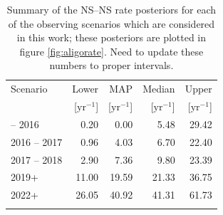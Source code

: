 \documentclass[twocolumn,nofootinbib]{revtex4-1}
\newcommand{\yr}{\mathrm{yr}}
\newcommand{\BNS}{\ac{NS}--\ac{NS}\xspace}
\newcommand{\dwnote}[1]{{\color{dwnote}{[\textbf{DW}: #1]}}}
\renewcommand{\dwnote}{}
\begin{document}
\begin{table}
\begin{center}
  \begin{tabular}{lrrrr}
    \toprule
    Scenario & Lower       & MAP             & Median          & Upper\\
             & [$\yr^{-1}$] & [$\yr^{-1}$]    & [$\yr^{-1}$]    & [$\yr^{-1}$]  \\
    \colrule
    2015 -- 2016 & 0.20 & 0.00 & 5.48 & 29.42\\
    2016 -- 2017 & 0.96 & 4.03 & 6.70 & 22.40\\
    2017 -- 2018 & 2.90 & 7.36 & 9.80 & 23.39\\
    2019+ & 11.00 & 19.59 & 21.33 & 36.75\\
    2022+ & 26.05 & 40.92 & 41.31 & 61.73\\
    \botrule
\end{tabular}
\end{center}

\caption{Summary of the \BNS rate posteriors for each of the observing
  scenarios which are considered in this work; these posteriors are plotted
  in figure \ref{fig:aligorate}.
  \dwnote{Need to update these numbers to proper intervals.}
  \label{tab:rateposteriors}
}
\end{table}
\end{document}
